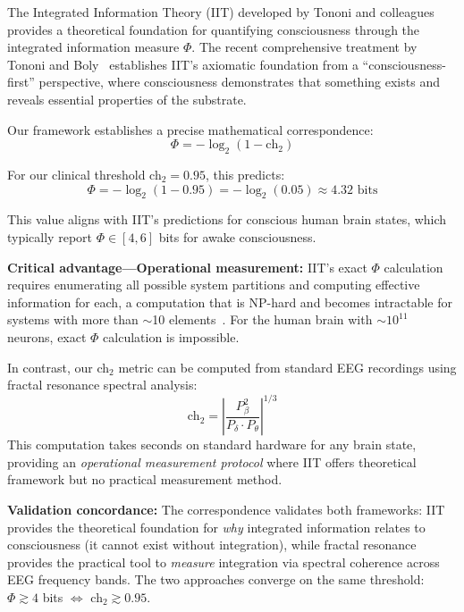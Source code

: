 \begin{remark}
The Integrated Information Theory (IIT) developed by Tononi and colleagues provides a theoretical foundation for quantifying consciousness through the integrated information measure $\Phi$. The recent comprehensive treatment by Tononi and Boly~\cite{tononi2025iit} establishes IIT's axiomatic foundation from a ``consciousness-first'' perspective, where consciousness demonstrates that something exists and reveals essential properties of the substrate.

Our framework establishes a precise mathematical correspondence:
\begin{equation}
\Phi = -\log_2(1 - \text{ch}_2)
\end{equation}

For our clinical threshold ch$_2 = 0.95$, this predicts:
\[
\Phi = -\log_2(1 - 0.95) = -\log_2(0.05) \approx 4.32 \text{ bits}
\]

This value aligns with IIT's predictions for conscious human brain states, which typically report $\Phi \in [4, 6]$ bits for awake consciousness.

\textbf{Critical advantage—Operational measurement:} IIT's exact $\Phi$ calculation requires enumerating all possible system partitions and computing effective information for each, a computation that is NP-hard and becomes intractable for systems with more than $\sim$10 elements~\cite{oizumi2014}. For the human brain with $\sim 10^{11}$ neurons, exact $\Phi$ calculation is impossible.

In contrast, our ch$_2$ metric can be computed from standard EEG recordings using fractal resonance spectral analysis:
\begin{equation}
\text{ch}_2 = \left|\frac{P_{\beta}^2}{P_{\delta} \cdot P_{\theta}}\right|^{1/3}
\end{equation}
This computation takes seconds on standard hardware for any brain state, providing an \emph{operational measurement protocol} where IIT offers theoretical framework but no practical measurement method.

\textbf{Validation concordance:} The correspondence validates both frameworks: IIT provides the theoretical foundation for \emph{why} integrated information relates to consciousness (it cannot exist without integration), while fractal resonance provides the practical tool to \emph{measure} integration via spectral coherence across EEG frequency bands. The two approaches converge on the same threshold: $\Phi \gtrsim 4$ bits $\Leftrightarrow$ ch$_2 \gtrsim 0.95$.
\end{remark}

